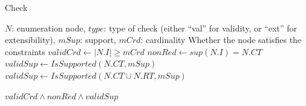 \documentclass[
]{ceurart}
\begin{document}
\begin{algorithm}[t]
\scriptsize\centering
\caption{Check}\label{alg:filterE}
\begin{algorithmic}[1]
\Require $N$: enumeration node, $type$: type of check (either ``val'' for validity, or ``ext'' for extensibility), $mSup$: support, $mCrd$: cardinality
\Ensure Whether the node satisfies the constraints
\State $validCrd \gets |N.I| \ge mCrd$   \label{alg:filterE1} 
\State $nonRed \gets sup(N.I) = N.CT$  \label{alg:filterE3}
    \State $validSup \gets IsSupported(N.CT, mSup)$   \label{alg:filterE2Val}
    \State $validSup \gets IsSupported(N.CT \cup N.RT, mSup)$ \label{alg:filterE2Ext}
    \item[]   
\EndIf
\State \Return $ validCrd \wedge nonRed \wedge validSup$ 
\end{algorithmic}
\end{algorithm}
\end{document}
